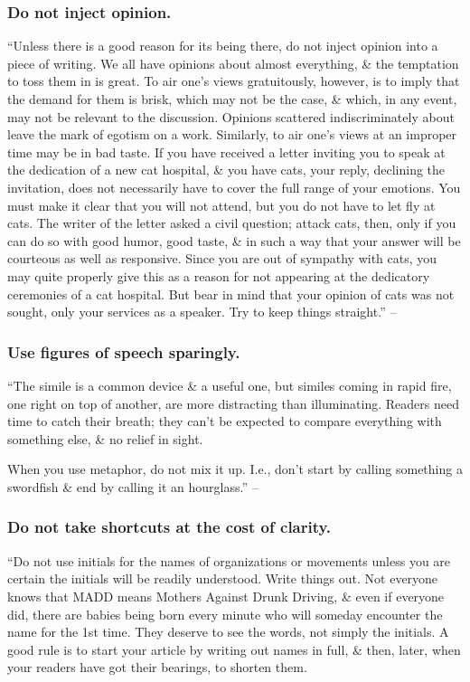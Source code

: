 \documentclass{article}
\begin{document}
\subsubsection{Do not inject opinion.}
``Unless there is a good reason for its being there, do not inject opinion into a piece of writing. We all have opinions about almost everything, \& the temptation to toss them in is great. To air one's views gratuitously, however, is to imply that the demand for them is brisk, which may not be the case, \& which, in any event, may not be relevant to the discussion. Opinions scattered indiscriminately about leave the mark of egotism on a work. Similarly, to air one's views at an improper time may be in bad taste. If you have received a letter inviting you to speak at the dedication of a new cat hospital, \& you have cats, your reply, declining the invitation, does not necessarily have to cover the full range of your emotions. You must make it clear that you will not attend, but you do not have to let fly at cats. The writer of the letter asked a civil question; attack cats, then, only if you can do so with good humor, good taste, \& in such a way that your answer will be courteous as well as responsive. Since you are out of sympathy with cats, you may quite properly give this as a reason for not appearing at the dedicatory ceremonies of a cat hospital. But bear in mind that your opinion of cats was not sought, only your services as a speaker. Try to keep things straight.'' -- \cite[p. 96]{Strunk_White_element_style}


\subsubsection{Use figures of speech sparingly.}
``The simile is a common device \& a useful one, but similes coming in rapid fire, one right on top of another, are more distracting than illuminating. Readers need time to catch their breath; they can't be expected to compare everything with something else, \& no relief in sight.

When you use metaphor, do not mix it up. I.e., don't start by calling something a swordfish \& end by calling it an hourglass.'' -- \cite[p. 97]{Strunk_White_element_style}


\subsubsection{Do not take shortcuts at the cost of clarity.}
``Do not use initials for the names of organizations or movements unless you are certain the initials will be readily understood. Write things out. Not everyone knows that MADD means Mothers Against Drunk Driving, \& even if everyone did, there are babies being born every minute who will someday encounter the name for the 1st time. They deserve to see the words, not simply the initials. A good rule is to start your article by writing out names in full, \& then, later, when your readers have got their bearings, to shorten them.
\end{document}

